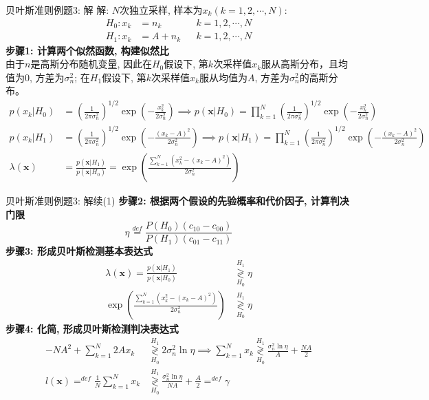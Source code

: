 \begin{frame}[shrink]{贝叶斯准则例题3: 解}
解: $N$次独立采样, 样本为$x_k(k=1,2,\cdots,N)$:
\begin{align*}
H_0: x_k&=n_k && k=1,2,\cdots,N\\
H_1: x_k&=A+n_k && k=1,2,\cdots,N
\end{align*}
\textbf{步骤1: 计算两个似然函数, 构建似然比}\\
由于$n$是高斯分布随机变量, 因此在$H_0$假设下, 第$k$次采样值$x_k$服从高斯分布，且均值为0, 方差为$\sigma_n^2$; 在$H_1$假设下, 第$k$次采样值$x_k$服从均值为$A$, 方差为$\sigma_n^2$的高斯分布。
\begin{align*}
p(x_k|H_0)&=\left(\frac{1}{2\pi\sigma_n^2}\right)^{1/2}\exp\left(-\frac{x_k^2}{2\sigma_n^2}\right)\implies p(\bm{x}|H_0)=\prod_{k=1}^{N}\left(\frac{1}{2\pi\sigma_n^2}\right)^{1/2}\exp\left(-\frac{x_k^2}{2\sigma_n^2}\right)\\
p(x_k|H_1)&=\left(\frac{1}{2\pi\sigma_n^2}\right)^{1/2}\exp\left(-\frac{(x_k-A)^2}{2\sigma_n^2}\right)\implies p(\bm{x}|H_1)=\prod_{k=1}^{N}\left(\frac{1}{2\pi\sigma_n^2}\right)^{1/2}\exp\left(-\frac{(x_k-A)^2}{2\sigma_n^2}\right)\\
\lambda(\bm{x})&=\frac{p(\bm{x}|H_1)}{p(\bm{x}|H_0)}=\exp\left(\frac{\sum\limits_{k=1}^{N}(x_k^2-(x_k-A)^2)}{2\sigma_n^2}\right)
\end{align*} 
\end{frame}

\begin{frame}[shrink]{贝叶斯准则例题3: 解续(1)}
\textbf{步骤2: 根据两个假设的先验概率和代价因子, 计算判决门限}
\[\eta\mathop{=}\limits^{def}\frac{P(H_0)(c_{10}-c_{00})}{P(H_1)(c_{01}-c_{11})} \]
\textbf{步骤3: 形成贝叶斯检测基本表达式}
\begin{align*}
\lambda(\bm{x})=\frac{p(\bm{x}|H_1)}{p(\bm{x}|H_0)}&\mathop{\gtrless}\limits_{H_0}^{H_1}\eta\\
\exp\left(\frac{\sum\limits_{k=1}^{N}(x_k^2-(x_k-A)^2)}{2\sigma_n^2}\right)&\mathop{\gtrless}\limits_{H_0}^{H_1}\eta
\end{align*} 
\textbf{步骤4: 化简, 形成贝叶斯检测判决表达式}
\begin{align*}
-NA^2+\sum\limits_{k=1}^{N}2Ax_k&\mathop{\gtrless}\limits_{H_0}^{H_1}2\sigma_n^2\ln\eta\implies \sum\limits_{k=1}^{N}x_k\mathop{\gtrless}\limits_{H_0}^{H_1}\frac{\sigma_n^2\ln\eta}{A}+\frac{NA}{2}\\
l(\bm{x})\mathop{=}^{def}\frac{1}{N}\sum\limits_{k=1}^{N}x_k&\mathop{\gtrless}\limits_{H_0}^{H_1}\frac{\sigma_n^2\ln\eta}{NA}+\frac{A}{2}\mathop{=}^{def}\gamma\\
\end{align*} 
\end{frame}

